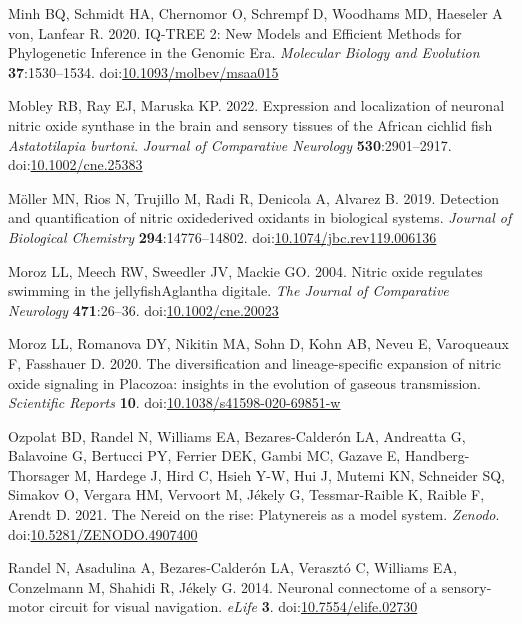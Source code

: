 \documentclass[
  10pt,
  onecolumn]{article}
\newlength{\cslhangindent}
\newlength{\cslentryspacingunit} %
\newenvironment{CSLReferences}[2] %
 {%
  \setlength{\parindent}{0pt}
  \ifodd #1
  \let\oldpar\par
  \def\par{\hangindent=\cslhangindent\oldpar}
  \fi
  \setlength{\parskip}{#2\cslentryspacingunit}
 }%
 {}
\begin{document}
\begin{CSLReferences}{1}{0}
\leavevmode{}%
Minh BQ, Schmidt HA, Chernomor O, Schrempf D, Woodhams MD, Haeseler A
von, Lanfear R. 2020. IQ-TREE 2: New Models and Efficient Methods for
Phylogenetic Inference in the Genomic Era. \emph{Molecular Biology and
Evolution} \textbf{37}:1530--1534.
doi:\href{https://doi.org/10.1093/molbev/msaa015}{10.1093/molbev/msaa015}

\leavevmode{}%
Mobley RB, Ray EJ, Maruska KP. 2022. Expression and localization of
neuronal nitric oxide synthase in the brain and sensory tissues of the
African cichlid fish {\emph{Astatotilapia burtoni}}. \emph{Journal of
Comparative Neurology} \textbf{530}:2901--2917.
doi:\href{https://doi.org/10.1002/cne.25383}{10.1002/cne.25383}

\leavevmode{}%
Möller MN, Rios N, Trujillo M, Radi R, Denicola A, Alvarez B. 2019.
Detection and quantification of nitric oxide{\textendash}derived
oxidants in biological systems. \emph{Journal of Biological Chemistry}
\textbf{294}:14776--14802.
doi:\href{https://doi.org/10.1074/jbc.rev119.006136}{10.1074/jbc.rev119.006136}

\leavevmode{}%
Moroz LL, Meech RW, Sweedler JV, Mackie GO. 2004. Nitric oxide regulates
swimming in the jellyfishAglantha digitale. \emph{The Journal of
Comparative Neurology} \textbf{471}:26--36.
doi:\href{https://doi.org/10.1002/cne.20023}{10.1002/cne.20023}

\leavevmode{}%
Moroz LL, Romanova DY, Nikitin MA, Sohn D, Kohn AB, Neveu E, Varoqueaux
F, Fasshauer D. 2020. The diversification and lineage-specific expansion
of nitric oxide signaling in Placozoa: insights in the evolution of
gaseous transmission. \emph{Scientific Reports} \textbf{10}.
doi:\href{https://doi.org/10.1038/s41598-020-69851-w}{10.1038/s41598-020-69851-w}

\leavevmode{}%
Ozpolat BD, Randel N, Williams EA, Bezares-Calderón LA, Andreatta G,
Balavoine G, Bertucci PY, Ferrier DEK, Gambi MC, Gazave E,
Handberg-Thorsager M, Hardege J, Hird C, Hsieh Y-W, Hui J, Mutemi KN,
Schneider SQ, Simakov O, Vergara HM, Vervoort M, Jékely G,
Tessmar-Raible K, Raible F, Arendt D. 2021. The Nereid on the rise:
Platynereis as a model system. \emph{Zenodo}.
doi:\href{https://doi.org/10.5281/ZENODO.4907400}{10.5281/ZENODO.4907400}

\leavevmode{}%
Randel N, Asadulina A, Bezares-Calderón LA, Verasztó C, Williams EA,
Conzelmann M, Shahidi R, Jékely G. 2014. Neuronal connectome of a
sensory-motor circuit for visual navigation. \emph{eLife} \textbf{3}.
doi:\href{https://doi.org/10.7554/elife.02730}{10.7554/elife.02730}


\end{CSLReferences}
\end{document}
